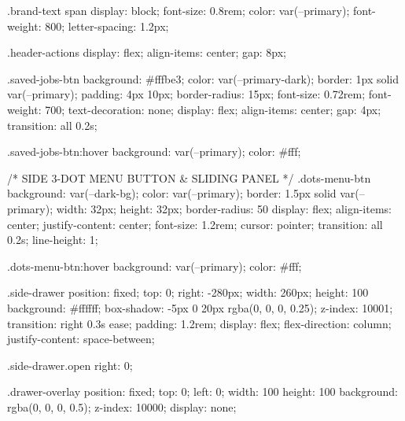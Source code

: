         .brand-text span {
            display: block;
            font-size: 0.8rem;
            color: var(--primary);
            font-weight: 800;
            letter-spacing: 1.2px;
        }

        .header-actions {
            display: flex;
            align-items: center;
            gap: 8px;
        }

        .saved-jobs-btn {
            background: #fffbe3;
            color: var(--primary-dark);
            border: 1px solid var(--primary);
            padding: 4px 10px;
            border-radius: 15px;
            font-size: 0.72rem;
            font-weight: 700;
            text-decoration: none;
            display: flex;
            align-items: center;
            gap: 4px;
            transition: all 0.2s;
        }

        .saved-jobs-btn:hover {
            background: var(--primary);
            color: #fff;
        }

        /* SIDE 3-DOT MENU BUTTON & SLIDING PANEL */
        .dots-menu-btn {
            background: var(--dark-bg);
            color: var(--primary);
            border: 1.5px solid var(--primary);
            width: 32px;
            height: 32px;
            border-radius: 50%
            display: flex;
            align-items: center;
            justify-content: center;
            font-size: 1.2rem;
            cursor: pointer;
            transition: all 0.2s;
            line-height: 1;
        }

        .dots-menu-btn:hover {
            background: var(--primary);
            color: #fff;
        }

        .side-drawer {
            position: fixed;
            top: 0;
            right: -280px;
            width: 260px;
            height: 100%
            background: #ffffff;
            box-shadow: -5px 0 20px rgba(0, 0, 0, 0.25);
            z-index: 10001;
            transition: right 0.3s ease;
            padding: 1.2rem;
            display: flex;
            flex-direction: column;
            justify-content: space-between;
        }

        .side-drawer.open {
            right: 0;
        }

        .drawer-overlay {
            position: fixed;
            top: 0;
            left: 0;
            width: 100%
            height: 100%
            background: rgba(0, 0, 0, 0.5);
            z-index: 10000;
            display: none;
        }

